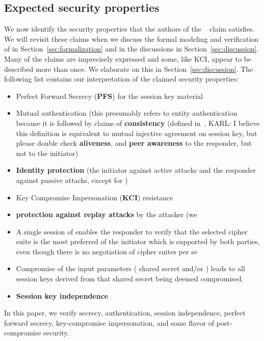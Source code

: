 \subsection{Expected security properties}
\label{sec:claimedProperties}
\fillhack
We now identify the security properties that the authors
of the \mSpec{}~\cite{selander-lake-edhoc-01} claim \mEdhoc{} satisfies.
%
We will revisit these claims when we discuss the formal modeling and
verification of \mEdhoc{} in Section~\ref{sec:formalization} and in the
discussions in Section~\ref{sec:discussion}.
%
Many of the claims are imprecisely expressed and some, like KCI, appear to be
described more than once.
%
We elaborate on this in Section~\ref{sec:discussion}.
%
The following list contains our interpretation of the claimed security
properties:
\begin{itemize}
    \item Perfect Forward Secrecy (\textbf{PFS}) for the session key material
    \item Mutual authentication (this presumably refers to entity authentication
        because it is followed by claims of
        \textbf{consistency} (defined in~\cite{sigma}, {\color{red} KARL: I
            believe this definition is equivalent to mutual injective agreement
            on session key, but please double check}
        \textbf{aliveness}, and
        \textbf{peer awareness} to the responder, but not to the initiator)
    \item \textbf{Identity protection} (the initiator against active attacks
        and the responder against passive attacks, except for \mPskPsk{})
    \item Key Compromise Impersonation (\textbf{KCI}) resistance
    \item \textbf{protection against replay attacks} by the attacker (we
    \item A single session of \mEdhoc{} enables the responder to verify
            that the selected cipher suite is the most preferred of the
            initiator which is supported by both parties, even though there is
            no negotiation of cipher suites per se
    \item Compromise of the \mHkdf{} input parameters (\mGxy{} shared
            secret and/or \mPsk) leads to all session keys derived from that
            shared secret being deemed compromised.
        \item \textbf{Session key independence}
\end{itemize}
%
In this paper, we verify {\color{red} secrecy, authentication, session independence,
perfect forward secrecy, key-compromise impersonation, and some
flavor of post-compromise security.}
%
